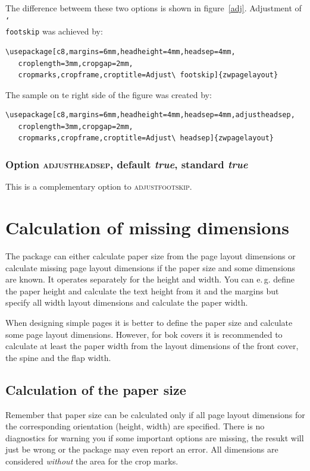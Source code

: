 \documentclass[11pt]{article}
\makeatletter
\def\omg#1{\ifvmode\leavevmode\fi\marginpar{\raggedright\hspace{0pt}\opt{#1}}\ignorespaces}
\def\opt#1{\texorpdfstring{\textmd{\textsc{#1}}}{#1}}
\DeclareRobustCommand\cmd[1]{\texttt{\char`\\#1}}
\def\eg.{e.\,g.\@}
\def\true{\bool{true}}
\def\bool#1{\texorpdfstring{\textit{#1}}{#1}}
\let\zwcomma\,
\def\,{\texorpdfstring{\zwcomma}{}}
\makeatother
\begin{document}
The difference betweem these two options is shown in figure~\ref{adj}. Adjustment of \cmd{footskip}
was achieved by:

\vb
\begin{verbatim}
\usepackage[c8,margins=6mm,headheight=4mm,headsep=4mm,
   croplength=3mm,cropgap=2mm,
   cropmarks,cropframe,croptitle=Adjust\ footskip]{zwpagelayout}
\end{verbatim}

\vb \noindent
The sample on te right side of the figure was created by:

\vb
\begin{verbatim}
\usepackage[c8,margins=6mm,headheight=4mm,headsep=4mm,adjustheadsep,
   croplength=3mm,cropgap=2mm,
   cropmarks,cropframe,croptitle=Adjust\ headsep]{zwpagelayout}
\end{verbatim}

\subsubsection{Option \opt{adjustheadsep}, default \true, standard \true}
\omg{adjustheadsep}
This is a complementary option to \opt{adjustfootskip}.

\section{Calculation of missing dimensions}\label{missing}
The package can either calculate paper size from the page layout dimensions or calculate missing
page layout dimensions if the paper size and some dimensions are known. It operates separately for
the height and width. You can \eg. define the paper height and calculate the text height from it
and the margins but specify all width layout dimensions and calculate the paper width.

When designing simple pages it is better to define the paper size and calculate some page layout
dimensions. However, for bok covers it is recommended to calculate at least the paper width from
the layout dimensions of the front cover, the spine and the flap width.

\subsection{Calculation of the paper size}
Remember that paper size can be calculated only if all page layout dimensions for the corresponding
orientation (height, width) are specified. There is no diagnostics for warning you if some
important options are missing, the resukt will just be wrong or the package may even report an
error. All dimensions are considered \emph{without} the area for the crop marks.
\end{document}
